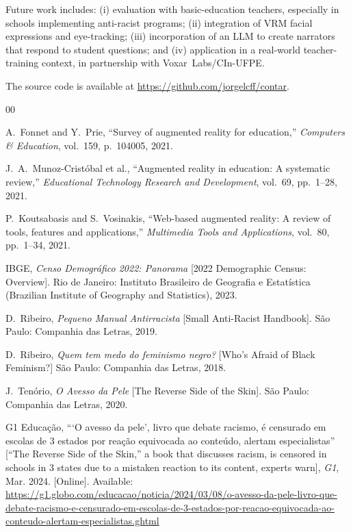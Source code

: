 \documentclass[conference]{IEEEtran}
\begin{document}
Future work includes: (i) evaluation with basic-education teachers,
especially in schools implementing anti-racist programs; (ii) integration of
VRM facial expressions and eye-tracking; (iii) incorporation of an LLM to
create narrators that respond to student questions; and (iv) application in
a real-world teacher-training context, in partnership with Voxar~Labs/CIn-UFPE.

The source code is available at \url{https://github.com/jorgelcff/contar}.

\begin{thebibliography}{00}

A.~Fonnet and Y.~Prie, ``Survey of augmented reality for education,''
\textit{Computers \& Education}, vol.~159, p.~104005, 2021.

J.~A.~Munoz-Cristóbal et al., ``Augmented reality in education: A systematic
review,'' \textit{Educational Technology Research and Development}, vol.~69,
pp.~1--28, 2021.

P.~Koutsabasis and S.~Vosinakis, ``Web-based augmented reality: A review of
tools, features and applications,'' \textit{Multimedia Tools and Applications},
vol.~80, pp.~1--34, 2021.

IBGE, \textit{Censo Demográfico 2022: Panorama} [2022 Demographic Census:
Overview]. Rio de Janeiro: Instituto Brasileiro de Geografia e Estatística
(Brazilian Institute of Geography and Statistics), 2023.

D.~Ribeiro, \textit{Pequeno Manual Antirracista} [Small Anti-Racist
Handbook]. São Paulo: Companhia das Letras, 2019.

D.~Ribeiro, \textit{Quem tem medo do feminismo negro?} [Who's Afraid of
Black Feminism?] São Paulo: Companhia das Letras, 2018.

J.~Tenório, \textit{O Avesso da Pele} [The Reverse Side of the Skin]. São
Paulo: Companhia das Letras, 2020.

G1 Educação, ```O avesso da pele', livro que debate racismo, é censurado em
escolas de 3 estados por reação equivocada ao conteúdo, alertam
especialistas'' [``The Reverse Side of the Skin,'' a book that discusses
racism, is censored in schools in 3 states due to a mistaken reaction to its
content, experts warn], \textit{G1}, Mar. 2024. [Online]. Available:
\url{https://g1.globo.com/educacao/noticia/2024/03/08/o-avesso-da-pele-livro-que-debate-racismo-e-censurado-em-escolas-de-3-estados-por-reacao-equivocada-ao-conteudo-alertam-especialistas.ghtml}


\end{thebibliography}
\end{document}

